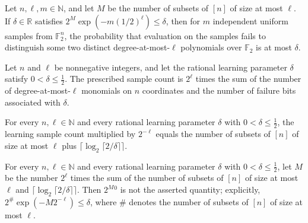 \begin{theorem}
\leanok
{}
Let $n,\ell,m\in\mathbb{N}$, and let $M$ be the number of subsets of $[n]$ of size at
most $\ell$. If $\delta\in\mathbb{R}$ satisfies
$2^M\exp\!\left(-m(1/2)^\ell\right)\le\delta$, then for $m$ independent uniform samples
from $\mathbb{F}_2^n$, the probability that evaluation on the samples fails to
distinguish some two distinct degree-at-most-$\ell$ polynomials over $\mathbb{F}_2$ is
at most $\delta$.
\end{theorem}

\begin{definition}
\leanok
{}
Let $n$ and $\ell$ be nonnegative integers, and let the rational learning parameter
$\delta$ satisfy $0<\delta\leq \tfrac12$. The prescribed sample count is $2^\ell$ times
the sum of the number of degree-at-most-$\ell$ monomials on $n$ coordinates and the
number of failure bits associated with $\delta$.
\end{definition}

\begin{theorem}
\leanok
{}
For every $n,\ell\in\mathbb{N}$ and every rational learning parameter $\delta$ with
$0<\delta\leq\frac12$, the learning sample count multiplied by $2^{-\ell}$ equals the
number of subsets of $[n]$ of size at most $\ell$ plus
$\lceil\log_2\lceil2/\delta\rceil\rceil$.
\end{theorem}

\begin{theorem}
\leanok
{}
For every $n,\ell\in\mathbb{N}$ and every rational learning parameter $\delta$ with
$0<\delta\leq \frac12$, let $M$ be the number $2^\ell$ times the sum of the number of
subsets of $[n]$ of size at most $\ell$ and $\lceil\log_2\lceil2/\delta\rceil\rceil$.
Then $2^M{}^{\!0}$ is not the asserted quantity; explicitly, $2^{\#}\exp\!\left(-M
2^{-\ell}\right)\leq\delta$, where $\# $ denotes the number of subsets of $[n]$ of size
at most $\ell$.
\end{theorem}

